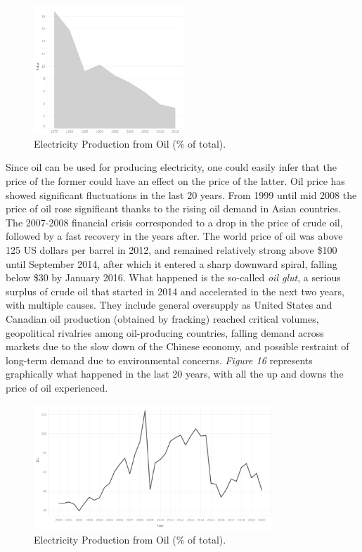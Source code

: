 \documentclass{book}
\begin{document}
\bigskip
\begin{figure}[H]
\begin{center}
\captionsetup{justification=centering}
\includegraphics[width=0.5\textwidth]{Images/oil.png}
\caption{Electricity Production from Oil (\% of total). }
\end{center}
\end{figure}
\bigskip
 
Since oil can be used for producing electricity, one could easily infer that the price of the former could have an effect on the price of the latter. Oil price has showed significant fluctuations in the last 20 years. From 1999 until mid 2008 the price of oil rose significant thanks to the rising oil demand in Asian countries. The 2007-2008 financial crisis corresponded to a drop in the price of crude oil, followed by a fast recovery in the years after. The world price of oil was above 125 US dollars per barrel in 2012, and remained relatively strong above \$100 until September 2014, after which it entered a sharp downward spiral, falling below \$30 by January 2016. What happened is the so-called \textit{oil glut}, a serious surplus of crude oil that started in 2014 and accelerated in the next two years, with multiple causes. They include general oversupply as United States and Canadian oil production (obtained by fracking) reached critical volumes, geopolitical rivalries among oil-producing countries, falling demand across markets due to the slow down of the Chinese economy, and possible restraint of long-term demand due to environmental concerns. \textit{Figure 16} represents graphically what happened in the last 20 years, with all the up and downs the price of oil experienced.

\bigskip
\begin{figure}[H]
\begin{center}
\captionsetup{justification=centering}
\includegraphics[width=0.8\textwidth]{Images/oilbeh.png}
\caption{Electricity Production from Oil (\% of total). }
\end{center}
\end{figure}
\bigskip
\end{document}
